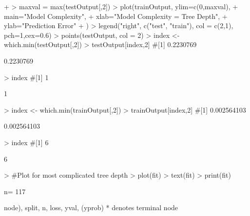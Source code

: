 \documentclass{article}
\begin{document}
\begin{Schunk}
\begin{Sinput}
{+ }    
> maxval = max(testOutput[,2])
> plot(trainOutput, ylim=c(0,maxval),
+ 		main="Model Complexity",
+ 		xlab="Model Complexity = Tree Depth",
+ 		ylab="Prediction Error"
+ 	)
> legend("right", c("test", "train"), col = c(2,1), pch=1,cex=0.6)
> points(testOutput, col = 2)
> index <- which.min(testOutput[,2]) 
> testOutput[index,2]  #[1] 0.2230769
\end{Sinput}
\begin{Soutput}
[1] 0.2230769
\end{Soutput}
\begin{Sinput}
> index  #[1] 1
\end{Sinput}
\begin{Soutput}
[1] 1
\end{Soutput}
\begin{Sinput}
> index <- which.min(trainOutput[,2]) 
> trainOutput[index,2]  #[1] 0.002564103
\end{Sinput}
\begin{Soutput}
[1] 0.002564103
\end{Soutput}
\begin{Sinput}
> index  #[1] 6
\end{Sinput}
\begin{Soutput}
[1] 6
\end{Soutput}
\begin{Sinput}
> #Plot for most complicated tree depth
> plot(fit)
> text(fit)
> print(fit)
\end{Sinput}
\begin{Soutput}
n= 117 

node), split, n, loss, yval, (yprob)
      * denotes terminal node


\end{Soutput}
\end{Schunk}
\end{document}

